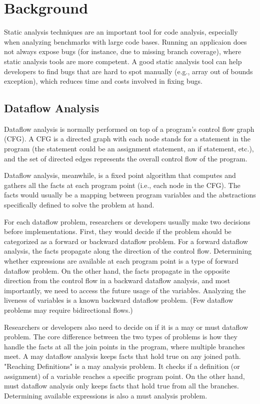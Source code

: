 \chapter{Background}
\label{chap:background}

Static analysis techniques are an important tool for code analysis, especially when analyzing benchmarks with large code bases. Running an applicaion does not always expose bugs (for instance, due to missing branch coverage), where static analysis tools are more competent. A good static analysis tool can help developers to find bugs that are hard to spot manually (e.g., array out of bounds exception), which reduces time and costs involved in fixing bugs. 

\section{Dataflow Analysis}

Dataflow analysis is normally performed on top of a program's control flow graph (CFG). A CFG is a directed graph with each node stands for a statement in the program (the statement could be an assignment statement, an if statement, etc.), and the set of directed edges represents the overall control flow of the program.

Dataflow analysis, meanwhile, is a fixed point algorithm that computes and gathers all the facts at each program point (i.e., each node in the CFG). The facts would usually be a mapping between program variables and the abstractions specifically defined to solve the problem at hand. 

For each dataflow problem, researchers or developers usually make two decisions before implementations. First, they would decide if the problem should be categorized as a forward or backward dataflow problem. For a forward dataflow analysis, the facts propagate along the direction of the control flow. Determining whether expressions are available at each program point is a type of forward dataflow problem. On the other hand, the facts propagate in the opposite direction from the control flow in a backward dataflow analysis, and most importantly, we need to access the future usage of the variables. Analyzing the liveness of variables is a known backward dataflow problem. (Few dataflow problems may require bidirectional flows.)

Researchers or developers also need to decide on if it is a may or must dataflow problem. The core difference between the two types of problems is how they handle the facts at all the join points in the program, where multiple branches meet. A may dataflow analysis keeps facts that hold true on any joined path. "Reaching Definitions" is a may analysis problem. It checks if a definition (or assignment) of a variable reaches a specific program point. On the other hand, must dataflow analysis only keeps facts that hold true from all the branches. Determining available expressions is also a must analysis problem.

